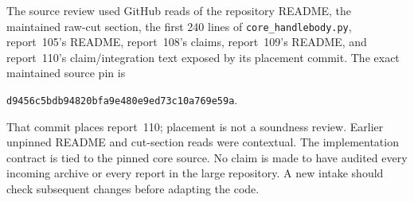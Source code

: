 \documentclass[11pt,letterpaper]{article}
\theoremstyle{definition}
\theoremstyle{remark}
\newcommand{\code}[1]{\texttt{\small #1}}
\begin{document}
The source review used GitHub reads of the repository README, the maintained raw-cut section, the first 240 lines of \code{core\_handlebody.py}, report~105's README, report~108's claims, report~109's README, and report~110's claim/integration text exposed by its placement commit. The exact maintained source pin is
\begin{center}\small\nolinkurl{d9456c5bdb94820bfa9e480e9ed73c10a769e59a}.\end{center}
That commit places report~110; placement is not a soundness review. Earlier unpinned README and cut-section reads were contextual. The implementation contract is tied to the pinned core source. No claim is made to have audited every incoming archive or every report in the large repository. A new intake should check subsequent changes before adapting the code.
\end{document}
